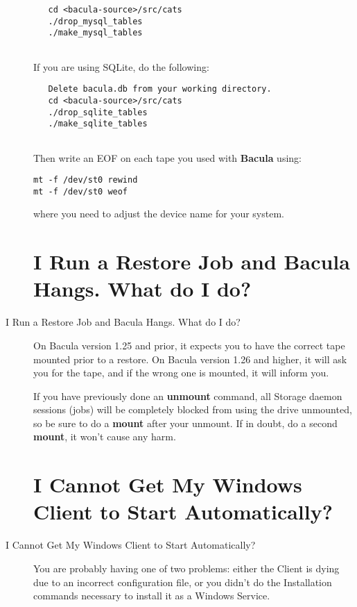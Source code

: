 \begin{description}
\footnotesize
\begin{verbatim}
   cd <bacula-source>/src/cats
   ./drop_mysql_tables
   ./make_mysql_tables
 
\end{verbatim}
\normalsize

If you are using SQLite, do the following:

\footnotesize
\begin{verbatim}
   Delete bacula.db from your working directory.
   cd <bacula-source>/src/cats
   ./drop_sqlite_tables
   ./make_sqlite_tables
 
\end{verbatim}
\normalsize

Then write an EOF on each tape you used with {\bf Bacula} using: 

\footnotesize
\begin{verbatim}
mt -f /dev/st0 rewind
mt -f /dev/st0 weof
\end{verbatim}
\normalsize

where you need to adjust the device name for your system.  

\label{restorehang}
\section{I Run a Restore Job and Bacula Hangs. What do I do?}
\item [I Run a Restore Job and Bacula Hangs. What do I do?]
   On Bacula version 1.25 and prior, it expects you to have the correct
   tape mounted prior to a restore.  On Bacula version 1.26 and higher, it
   will ask you for the tape, and if the wrong one is mounted, it will
   inform you.

   If you have previously done an {\bf unmount} command, all Storage daemon
   sessions (jobs) will be completely blocked from using the drive
   unmounted, so be sure to do a {\bf mount} after your unmount.  If in
   doubt, do a second {\bf mount}, it won't cause any harm.

\label{windowstart}
\section{I Cannot Get My Windows Client to Start Automatically? }
\item [I Cannot Get My Windows Client to Start Automatically? ]
   You are probably having one of two problems: either the Client is dying
   due to an incorrect configuration file, or you didn't do the
   Installation commands necessary to install it as a Windows Service.


\end{description}
